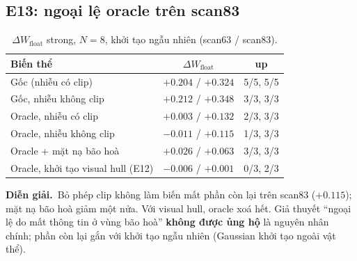 \documentclass[11pt,a4paper]{article}
\newcommand{\dW}{\Delta W_{\text{float}}}
\newcommand{\interp}{\par\smallskip\noindent\textbf{Diễn giải.}~}
\begin{document}
\subsection{E13: ngoại lệ oracle trên scan83}
\label{sec:e13}
\begin{table}[H]
\centering\small
\caption{$\dW$ strong, $N=8$, khởi tạo ngẫu nhiên (scan63 / scan83).}
\begin{tabular}{@{}lcc@{}}
\toprule
Biến thể & $\dW$ & up \\
\midrule
Gốc (nhiễu có clip) & $+0.204$ / $+0.324$ & 5/5, 5/5 \\
Gốc, nhiễu không clip & $+0.212$ / $+0.348$ & 3/3, 3/3 \\
Oracle, nhiễu có clip & $+0.003$ / $+0.132$ & 2/3, 3/3 \\
Oracle, nhiễu không clip & $-0.011$ / $+0.115$ & 1/3, 3/3 \\
Oracle + mặt nạ bão hoà & $+0.026$ / $+0.063$ & 3/3, 3/3 \\
Oracle, khởi tạo visual hull (E12) & $-0.006$ / $+0.001$ & 0/3, 2/3 \\
\bottomrule
\end{tabular}
\end{table}
\interp Bỏ phép clip không làm biến mất phần còn lại trên scan83 ($+0.115$); mặt nạ bão hoà giảm một nửa. Với visual hull, oracle xoá hết. Giả thuyết ``ngoại lệ do mất thông tin ở vùng bão hoà'' \textbf{không được ủng hộ} là nguyên nhân chính; phần còn lại gắn với khởi tạo ngẫu nhiên (Gaussian khởi tạo ngoài vật thể).
\end{document}
